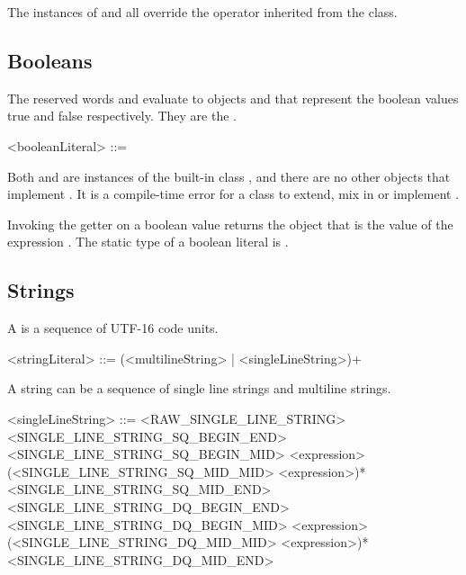 \documentclass[makeidx]{article}
\begin{document}
{\LMHash{}%
The instances of  and  all override
the \lit{==} operator inherited from the  class.


\subsection{Booleans}

\LMHash{}%
The reserved words \TRUE{} and \FALSE{} evaluate to objects
 and
that represent the boolean values true and false respectively.
They are the .

\begin{grammar}
<booleanLiteral> ::= \TRUE{}
  \alt \FALSE{}
\end{grammar}

\LMHash{}%
Both  and  are instances of
the built-in class ,
and there are no other objects that implement .
It is a compile-time error for a class to
extend, mix in or implement .


\LMHash{}%
Invoking the getter  on a boolean value returns
the  object that is the value of the expression .
The static type of a boolean literal is .


\subsection{Strings}

\LMHash{}%
A  is a sequence of UTF-16 code units.


\begin{grammar}
<stringLiteral> ::= (<multilineString> | <singleLineString>)+
\end{grammar}

\LMHash{}%
A string can be a sequence of single line strings and multiline strings.

\begin{grammar}
<singleLineString> ::= <RAW\_SINGLE\_LINE\_STRING>
  \alt <SINGLE\_LINE\_STRING\_SQ\_BEGIN\_END>
  \alt <SINGLE\_LINE\_STRING\_SQ\_BEGIN\_MID> <expression> \gnewline{}
       (<SINGLE\_LINE\_STRING\_SQ\_MID\_MID> <expression>)* \gnewline{}
       <SINGLE\_LINE\_STRING\_SQ\_MID\_END>
  \alt <SINGLE\_LINE\_STRING\_DQ\_BEGIN\_END>
  \alt <SINGLE\_LINE\_STRING\_DQ\_BEGIN\_MID> <expression> \gnewline{}
       (<SINGLE\_LINE\_STRING\_DQ\_MID\_MID> <expression>)* \gnewline{}
       <SINGLE\_LINE\_STRING\_DQ\_MID\_END>


\end{grammar}}
\end{document}

